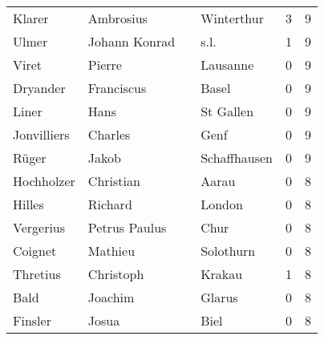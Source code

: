 \begin{tabular}{llllrr}
                   Klarer &                          Ambrosius &             &                                  Winterthur &          3 &         9 \\
                    Ulmer &                      Johann Konrad &             &                                        s.l. &          1 &         9 \\
                    Viret &                             Pierre &             &                                    Lausanne &          0 &         9 \\
                 Dryander &                         Franciscus &             &                                       Basel &          0 &         9 \\
                    Liner &                               Hans &             &                                   St Gallen &          0 &         9 \\
              Jonvilliers &                            Charles &             &                                        Genf &          0 &         9 \\
                    Rüger &                              Jakob &             &                                Schaffhausen &          0 &         9 \\
               Hochholzer &                          Christian &             &                                       Aarau &          0 &         8 \\
                   Hilles &                            Richard &             &                                      London &          0 &         8 \\
                Vergerius &                      Petrus Paulus &             &                                        Chur &          0 &         8 \\
                  Coignet &                            Mathieu &             &                                   Solothurn &          0 &         8 \\
                 Thretius &                          Christoph &             &                                      Krakau &          1 &         8 \\
                     Bald &                            Joachim &             &                                      Glarus &          0 &         8 \\
                  Finsler &                              Josua &             &                                        Biel &          0 &         8 \\

\end{tabular}
